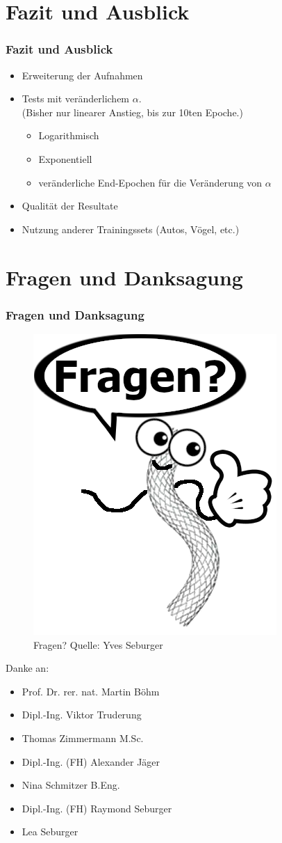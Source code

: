 \documentclass{beamer}
\begin{document}
\section{Fazit und Ausblick}
\begin{frame}
\frametitle{Fazit und Ausblick}
\begin{itemize}
    \item Erweiterung der Aufnahmen
    \item Tests mit veränderlichem $\alpha$. \\
    \small{(Bisher nur linearer Anstieg, bis zur 10ten Epoche.)}
    \begin{itemize}
        \item Logarithmisch
        \item Exponentiell
        \item veränderliche End-Epochen für die Veränderung von $\alpha$
    \end{itemize}
    \item Qualität der Resultate
    \item Nutzung anderer Trainingssets (Autos, Vögel, etc.)
\end{itemize}
\end{frame}

\section{Fragen und Danksagung}
\begin{frame}[allowframebreaks]
    \frametitle{Fragen und Danksagung}    
    \begin{figure}
        \includegraphics[width=0.45\linewidth]{Bilder/Happy Stent.png}
        \caption{Fragen? \scriptsize{Quelle: Yves Seburger}}
    \end{figure}
    \framebreak
    Danke an:
    \begin{itemize}
        \item Prof. Dr. rer. nat. Martin Böhm
        \item Dipl.-Ing. Viktor Truderung
        \item Thomas Zimmermann M.Sc.
        \item Dipl.-Ing. (FH) Alexander Jäger
        \item Nina Schmitzer B.Eng.
        \item Dipl.-Ing. (FH) Raymond Seburger
        \item Lea Seburger
    \end{itemize} 
\end{frame}
\end{document}
